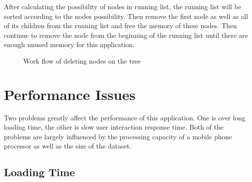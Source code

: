 \documentclass[MSc]{icldt}
\begin{document}
After calculating the possibility of nodes in running list, the running list will be sorted according to the nodes possibility. Then remove the first node as well as all of its children from the running list and free the memory of these nodes. Then continue to remove the node from the beginning of the running list until there are enough unused memory for this application.

\begin{figure} [H]
\caption{Work flow of deleting nodes on the tree}
\end{figure}


\chapter{Performance Issues}

Two problems greatly affect the performance of this application. One is over long loading time, the other is slow user interaction response time. Both of the problems are largely influenced by the processing capacity of a mobile phone processor as well as the size of the dataset. 

\section{Loading Time}
\end{document}
